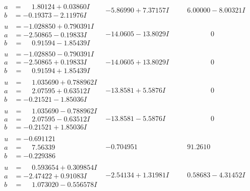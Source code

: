 \documentclass[1p]{elsarticle_modified}
\theoremstyle{definition}
\begin{document}
$$\begin{array}{c|c|c}
\begin{aligned}
a &= \phantom{-}1.80124 + 0.03860 I \\
b &= -0.19373 - 2.11976 I\end{aligned}
 & -5.86990 + 7.37157 I & \phantom{-}6.00000 - 8.00321 I \\ \hline\begin{aligned}
u &= -1.028850 + 0.790391 I \\
a &= -2.50865 - 0.19833 I \\
b &= \phantom{-}0.91594 - 1.85439 I\end{aligned}
 & -14.0605 - 13.8029 I & \phantom{-0.000000 } 0 \\ \hline\begin{aligned}
u &= -1.028850 - 0.790391 I \\
a &= -2.50865 + 0.19833 I \\
b &= \phantom{-}0.91594 + 1.85439 I\end{aligned}
 & -14.0605 + 13.8029 I & \phantom{-0.000000 } 0 \\ \hline\begin{aligned}
u &= \phantom{-}1.035690 + 0.788962 I \\
a &= \phantom{-}2.07595 + 0.63512 I \\
b &= -0.21521 - 1.85036 I\end{aligned}
 & -13.8581 + 5.5876 I & \phantom{-0.000000 } 0 \\ \hline\begin{aligned}
u &= \phantom{-}1.035690 - 0.788962 I \\
a &= \phantom{-}2.07595 - 0.63512 I \\
b &= -0.21521 + 1.85036 I\end{aligned}
 & -13.8581 - 5.5876 I & \phantom{-0.000000 } 0 \\ \hline\begin{aligned}
u &= -0.691121\phantom{ +0.000000I} \\
a &= \phantom{-}7.56339\phantom{ +0.000000I} \\
b &= -0.229386\phantom{ +0.000000I}\end{aligned}
 & -0.704951\phantom{ +0.000000I} & \phantom{-}91.2610\phantom{ +0.000000I} \\ \hline\begin{aligned}
u &= \phantom{-}0.593654 + 0.309854 I \\
a &= -2.47422 + 0.91083 I \\
b &= \phantom{-}1.073020 - 0.556578 I\end{aligned}
 & -2.54134 + 1.31981 I & \phantom{-}0.58683 - 4.31452 I \\ \hline\begin{aligned}

\end{aligned}
\end{array}$$
\end{document}
